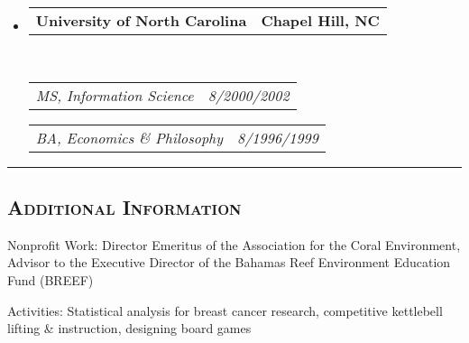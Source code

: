\documentclass[12pt,letterpaper,oneside]{article}
\makeatletter
\newenvironment{indentsection}[1]%
{\begin{list}{}%
	{\setlength{\leftmargin}{#1}}%
	\item[]%
}
{\end{list}}
\newcommand{\headerrow}[2]
{\begin{tabular*}{\linewidth}{l@{\extracolsep{\fill}}r}
	#1 &
	#2 \\
\end{tabular*}}
\makeatother
\begin{document}
\begin{itemize}
	\parskip=0.1em

	\item
	
	\headerrow
		{\textbf{University of North Carolina}}
		{\textbf{Chapel Hill, NC}}
	\\
	\headerrow
		{\emph{MS, Information Science}}
		{\emph{8/2000\textendash 12/2002}}
	\headerrow
		{\emph{BA, Economics \& Philosophy}}
		{\emph{8/1996\textendash 12/1999}}
	\vspace{-6mm}

\end{itemize}

\hrule
\vspace{-0.4em}
\subsection*{\centering\textsc{Additional Information}}

\begin{indentsection}{6mm}
\begin{description*}
	\setlength\itemsep{0.3em}
	\item[Nonprofit Work:]	Director Emeritus of the Association for the Coral Environment, \\
	Advisor to the Executive Director of the Bahamas Reef Environment Education Fund (BREEF)
	\item[Activities:] Statistical analysis for breast cancer research, competitive kettlebell lifting \& instruction, designing board games
\end{description*}
\end{indentsection}
\end{document}
